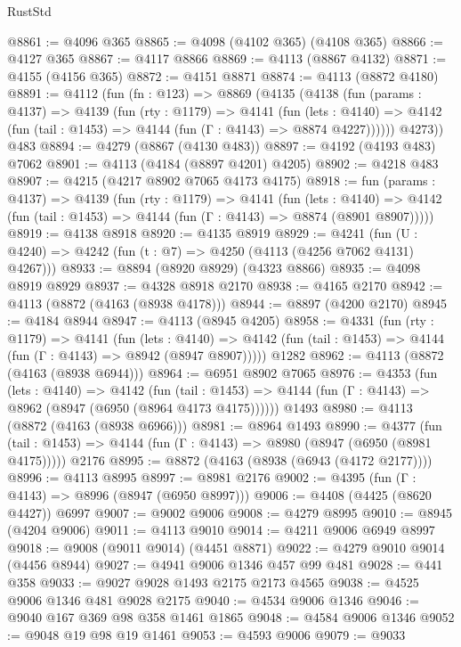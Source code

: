 \begin{lexlean}{RustStd}
\begin{coremodule}
@8861 := @4096 @365
@8865 := @4098 (@4102 @365) (@4108 @365)
@8866 := @4127 @365
@8867 := @4117 @8866
@8869 := @4113 (@8867 @4132)
@8871 := @4155 (@4156 @365)
@8872 := @4151 @8871
@8874 := @4113 (@8872 @4180)
@8891 := @4112
    (fun (fn : @123) =>
    @8869
      (@4135
        (@4138
          (fun (params : @4137) =>
          @4139
            (fun (rty : @1179) =>
            @4141
              (fun (lets : @4140) =>
              @4142 (fun (tail : @1453) => @4144 (fun (Γ : @4143) => @8874 @4227))))))
        @4273))
    @483
@8894 := @4279 (@8867 (@4130 @483))
@8897 := @4192 (@4193 @483) @7062
@8901 := @4113 (@4184 (@8897 @4201) @4205)
@8902 := @4218 @483
@8907 := @4215 (@4217 @8902 @7065 @4173 @4175)
@8918 := fun (params : @4137) =>
  @4139
    (fun (rty : @1179) =>
    @4141
      (fun (lets : @4140) =>
      @4142 (fun (tail : @1453) => @4144 (fun (Γ : @4143) => @8874 (@8901 @8907)))))
@8919 := @4138 @8918
@8920 := @4135 @8919
@8929 := @4241 (fun (U : @4240) => @4242 (fun (t : @7) => @4250 (@4113 (@4256 @7062 @4131) @4267)))
@8933 := @8894 (@8920 @8929) (@4323 @8866)
@8935 := @4098 @8919 @8929
@8937 := @4328 @8918 @2170
@8938 := @4165 @2170
@8942 := @4113 (@8872 (@4163 (@8938 @4178)))
@8944 := @8897 (@4200 @2170)
@8945 := @4184 @8944
@8947 := @4113 (@8945 @4205)
@8958 := @4331
    (fun (rty : @1179) =>
    @4141
      (fun (lets : @4140) =>
      @4142 (fun (tail : @1453) => @4144 (fun (Γ : @4143) => @8942 (@8947 @8907)))))
    @1282
@8962 := @4113 (@8872 (@4163 (@8938 @6944)))
@8964 := @6951 @8902 @7065
@8976 := @4353
    (fun (lets : @4140) =>
    @4142
      (fun (tail : @1453) => @4144 (fun (Γ : @4143) => @8962 (@8947 (@6950 (@8964 @4173 @4175))))))
    @1493
@8980 := @4113 (@8872 (@4163 (@8938 @6966)))
@8981 := @8964 @1493
@8990 := @4377
    (fun (tail : @1453) => @4144 (fun (Γ : @4143) => @8980 (@8947 (@6950 (@8981 @4175)))))
    @2176
@8995 := @8872 (@4163 (@8938 (@6943 (@4172 @2177))))
@8996 := @4113 @8995
@8997 := @8981 @2176
@9002 := @4395 (fun (Γ : @4143) => @8996 (@8947 (@6950 @8997)))
@9006 := @4408 (@4425 (@8620 @4427)) @6997
@9007 := @9002 @9006
@9008 := @4279 @8995
@9010 := @8945 (@4204 @9006)
@9011 := @4113 @9010
@9014 := @4211 @9006 @6949 @8997
@9018 := @9008 (@9011 @9014) (@4451 @8871)
@9022 := @4279 @9010 @9014 (@4456 @8944)
@9027 := @4941 @9006 @1346 @457 @99 @481
@9028 := @441 @358
@9033 := @9027 @9028 @1493 @2175 @2173 @4565
@9038 := @4525 @9006 @1346 @481 @9028 @2175
@9040 := @4534 @9006 @1346
@9046 := @9040 @167 @369 @98 @358 @1461 @1865
@9048 := @4584 @9006 @1346
@9052 := @9048 @19 @98 @19 @1461
@9053 := @4593 @9006
@9079 := @9033

\end{coremodule}
\end{lexlean}
